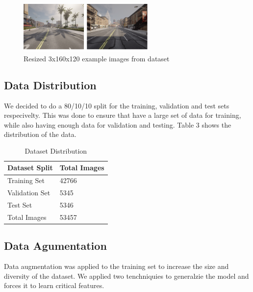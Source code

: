 \documentclass{article} %
\begin{document}
\begin{figure}[H] %
    \centering
    \includegraphics[width=0.6\textwidth]{exampleofdataset.png} %
    \caption{Resized 3x160x120 example images from dataset}
    \label{fig:example}
\end{figure}



\subsection{Data Distribution}
We decided to do a 80/10/10 split for the training, validation and test sets respecivelty. This was done to ensure that have a
large set of data for training, while also having enough data for validation and testing. Table 3 shows the distribution of the data.

\begin{table}[h]
\centering
\caption{Dataset Distribution}
\vspace{0.5em}
\begin{tabular}{|p{2cm}|p{2cm}|}
\hline
\textbf{Dataset Split} & \textbf{Total Images} \\ \hline
Training Set           & 42766 \\ \hline
Validation Set         & 5345 \\ \hline
Test Set               & 5346 \\ \hline
Total Images           & 53457  \\ \hline
\end{tabular}
\end{table}


\subsection{Data Agumentation}

Data augmentation was applied to the training set to increase the size and diversity of the dataset. We applied two tenchniquies to generalzie the model and forces
it to learn critical features. 
\end{document}
